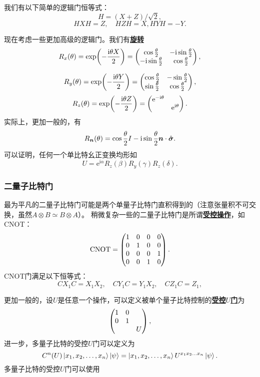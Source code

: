 \documentclass[hyperref, UTF8, a4paper]{ctexart}
\newcommand*{\ii}{\mathrm{i}}
\newcommand*{\ee}{\mathrm{e}}
\newcommand*{\concept}[1]{\underline{\textbf{#1}}}
\begin{document}
我们有以下简单的逻辑门恒等式：
\begin{equation}
    H = (X + Z) / \sqrt{2},
\end{equation}
\begin{equation}
    H X H = Z, \quad H Z H = X, H Y H = - Y.
\end{equation}

现在考虑一些更加高级的逻辑门。我们有\concept{旋转}
\begin{equation}
    R_x(\theta) = \exp(-\frac{\ii \theta X}{2}) = \pmqty{ \cos \frac{\theta}{2} & - \ii \sin \frac{\theta}{2} \\ - \ii \sin \frac{\theta}{2} & \cos \frac{\theta}{2} },
\end{equation}

\begin{equation}
    R_y(\theta) = \exp(-\frac{\ii \theta Y}{2}) = \pmqty{ \cos \frac{\theta}{2} & - \sin \frac{\theta}{2} \\ \sin \frac{\theta}{2} & \cos \frac{\theta}{2} },
\end{equation}
\begin{equation}
    R_z(\theta) = \exp(-\frac{\ii \theta Z}{2}) = \pmqty{\dmat{\ee^{-\ii \theta}, \ee^{\ii \theta}}}.
\end{equation}
实际上，更加一般的，有
\begin{equation}
    R_{\vb*{n}}(\theta) = \cos \frac{\theta}{2} I - \ii \sin \frac{\theta}{2} \vb*{n} \cdot \hat{\vb*{\sigma}}.
\end{equation}
可以证明，任何一个单比特幺正变换均形如
\begin{equation}
    U = \ee^{\ii \alpha} R_z(\beta) R_y(\gamma) R_z(\delta).
\end{equation}

\subsubsection{二量子比特门}

最为平凡的二量子比特门可能是两个单量子比特门直积得到的（注意张量积不可交换，虽然$A \otimes B \simeq B \otimes A$）。
稍微复杂一些的二量子比特门是所谓\concept{受控操作}，如CNOT：
\begin{equation}
    \mathrm{CNOT} = \pmqty{1 & 0 & 0 & 0 \\ 0 & 1 & 0 & 0 \\ 0 & 0 & 0 & 1 \\ 0 & 0 & 1 & 0}.
\end{equation}
CNOT门满足以下恒等式：
\begin{equation}
    C X_1 C = X_1 X_2, \quad C Y_1 C = Y_1 X_2, \quad C Z_1 C = Z_1,
\end{equation}

更加一般的，设$U$是任意一个操作，可以定义被单个量子比特控制的\concept{受控$U$门}为
\begin{equation}
    \pmqty{\dmat{1 & 0 \\ 0 & 1, U}},
\end{equation}
进一步，多量子比特的受控$U$门可以定义为
\begin{equation}
    C^n(U) \ket{x_1, x_2, \ldots, x_n} \ket{\psi} = \ket{x_1, x_2, \ldots, x_n} U^{x_1 x_2 \ldots x_n} \ket{\psi}.
\end{equation}
多量子比特的受控$U$门可以使用
\end{document}
